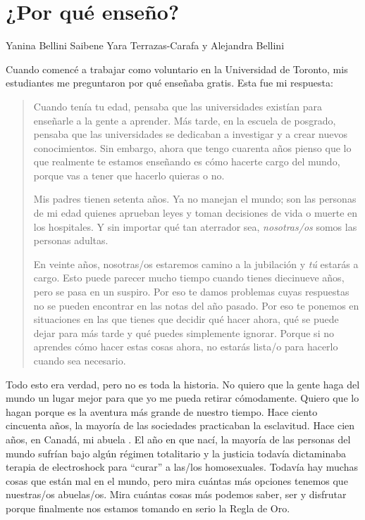 \chapter{¿Por qué enseño?}\label{s:finale}

\begin{reveiwer}
{Yanina Bellini Saibene}
{Yara Terrazas-Carafa y Alejandra Bellini}
\end{reveiwer}

Cuando comencé a trabajar como voluntario en la Universidad de Toronto,
mis estudiantes me preguntaron por qué enseñaba gratis.
Esta fue mi respuesta:

\begin{quote}

Cuando tenía tu edad,
pensaba que las universidades existían para enseñarle a la gente a aprender.
Más tarde,
en la escuela de posgrado,
pensaba que las universidades se dedicaban a investigar y a crear nuevos conocimientos.
Sin embargo, ahora que tengo cuarenta años
pienso que lo que realmente te estamos enseñando es
cómo hacerte cargo del mundo,
porque vas a tener que hacerlo quieras o no.

Mis padres tienen setenta años.
Ya no manejan el mundo;
son las personas de mi edad quienes aprueban leyes
y toman decisiones de vida o muerte en los hospitales.
Y sin importar qué tan aterrador sea,
\emph{nosotras/os} somos las personas adultas.

En veinte años,
nosotras/os estaremos camino a la jubilación y \emph{tú} estarás a cargo.
Esto puede parecer mucho tiempo cuando tienes diecinueve años,
pero se pasa en un suspiro.
Por eso te damos problemas cuyas respuestas no se pueden encontrar en las notas del año pasado.
Por eso te ponemos en situaciones en las que 
tienes que decidir qué hacer ahora, 
qué se puede dejar para más tarde
y qué puedes simplemente ignorar.
Porque si no aprendes cómo hacer estas cosas ahora,
no estarás lista/o para hacerlo cuando sea necesario.

\end{quote}

Todo esto era verdad,
pero no es toda la historia.
No quiero que la gente haga del mundo un lugar mejor para que yo me pueda retirar cómodamente.
Quiero que lo hagan porque es la aventura más grande de nuestro tiempo.
Hace ciento cincuenta años,
la mayoría de las sociedades practicaban la esclavitud.
Hace cien años, en Canadá,
mi abuela .
El año en que nací,
la mayoría de las personas del mundo sufrían bajo algún régimen totalitario
y la justicia todavía dictaminaba terapia de electroshock para ``curar'' a las/los homosexuales.
Todavía hay muchas cosas que están mal en el mundo,
pero mira cuántas más opciones tenemos que nuestras/os abuelas/os. 
Mira cuántas cosas más podemos saber, ser y disfrutar
porque finalmente nos estamos tomando en serio la Regla de Oro.

